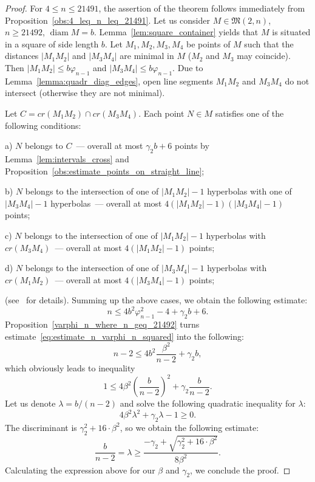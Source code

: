 \documentclass[a4paper,14pt]{article} %
\theoremstyle{plain}
\theoremstyle{definition}
\begin{document}
\begin{proof}
	For $4 \leq n \leq 21491$, the assertion of the theorem follows immediately from Proposition~\ref{obs:4_leq_n_leq_21491}.
	Let us consider $M\in \mathfrak{M}(2,n)$, $n \geq 21492$, $\operatorname{diam} M = b$.
	Lemma~\ref{lem:square_container} yields that $M$ is situated in a square of side length $b$.
	Let $M_1, M_2, M_3, M_4$ be points of $M$ such that the distances $|M_1 M_2|$ and $|M_3 M_4|$
	are minimal in $M$ ($M_2$ and $M_3$ may coincide).
	Then $|M_1 M_2| \leq b\varphi_{n-1}$ and $|M_3 M_4| \leq b\varphi_{n-1}$.
	Due to Lemma~\ref{lemma:quadr_diag_edges}, open line segments $M_1 M_2$ and $M_3 M_4$ do not intersect
	(otherwise they are not minimal).

	Let $C = cr(M_1 M_2) \cap cr(M_3 M_4)$.
	Each point $N\in M$ satisfies one of the following conditions:

	a) $N$ belongs to $C$~--- overall at most $\gamma_2 b + 6$ points by Lemma~\ref{lem:intervals_cross} and Proposition~\ref{obs:estimate_points_on_straight_line};

	b) $N$ belongs to the intersection of one of $|M_1 M_2| - 1$ hyperbolas
	with one of $|M_3 M_4| - 1$ hyperbolas~--- overall at most $4 (|M_1 M_2| - 1)(|M_3 M_4| - 1)$ points;

	c) $N$ belongs to the intersection of one of $|M_1 M_2| - 1$ hyperbolas with $cr(M_3 M_4)$~---
	overall at most $4 (|M_1 M_2| - 1)$ points;

	d) $N$ belongs to the intersection of one of $|M_3 M_4| - 1$ hyperbolas with $cr(M_1 M_2)$~---
	overall at most $4 (|M_3 M_4| - 1)$ points;

	(see~\cite{erdos1945integral} for details).
	Summing up the above cases, we obtain the following estimate:
	\begin{equation}
		\label{eq:estimate_n_varphi_n_squared}
		n \leq 4 b^2 \varphi_{n-1}^2 - 4 + \gamma_2 b + 6
		.
	\end{equation}
	Proposition~\ref{varphi_n_where_n_geq_21492} turns estimate~\eqref{eq:estimate_n_varphi_n_squared}
	into the following:
	\begin{equation}
		\label{eq:estimate_n_sqrt_n-2}
		n-2 \leq 4 b^2 \frac{\beta^2}{n-2} + \gamma_2 b
		,
	\end{equation}
	which obviously leads to inequality
	\begin{equation}
		1 \leq 4\beta^2 \left(\frac{b}{n-2}\right)^2  + \gamma_2 \frac{b}{n-2}
		.
	\end{equation}
	Let us denote $\lambda = b/(n-2)$ and solve the following quadratic inequality for $\lambda$:
	\begin{equation}
		\label{eq:square_inequality_lambda}
		4\beta^2 \lambda^2  + \gamma_2 \lambda - 1 \geq 0
		.
	\end{equation}
	The discriminant is $\gamma_2^2 + 16 \cdot \beta^2$,
	so we obtain the following estimate:
	\begin{equation}
		\frac{b}{n-2} = \lambda \geq \frac{-\gamma_2 + \sqrt{\gamma_2^2 + 16 \cdot \beta^2}}{8\beta^2}
		.
	\end{equation}
	Calculating the expression above for our $\beta$ and $\gamma_2$, we conclude the proof.
\end{proof}
\end{document}
